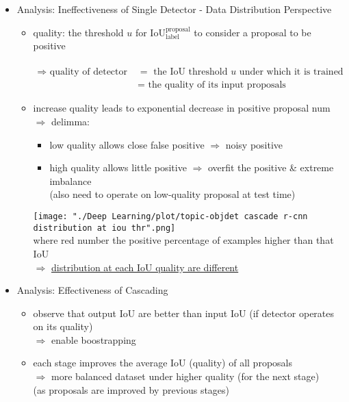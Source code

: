 \begin{itemize}
\begin{itemize}
	\item Analysis: Ineffectiveness of Single Detector - Data Distribution Perspective
		\begin{itemize}
		\item quality: the threshold $u$ for IoU$^\text{proposal}_\text{label}$ to consider a proposal to be positive \\
		\abovedisplayskip=2pt\abovedisplayshortskip=2pt~\vspace*{-\baselineskip}
		\begin{align*} \Rightarrow \text{ quality of detector } &= \text{ the IoU threshold } u \text{ under which it is trained} \\
		&= \text{ the quality of its input proposals} \end{align*}
		\item increase quality leads to exponential decrease in positive proposal num \\
		$\Rightarrow$ delimma: 
			\begin{itemize}
			\item low quality allows close false positive $\Rightarrow$ noisy positive
			\item high quality allows little positive $\Rightarrow$ overfit the positive \& extreme imbalance \\
			(also need to operate on low-quality proposal at test time)
			\end{itemize}
		\texttt{[image: "./Deep Learning/plot/topic-objdet cascade r-cnn distribution at iou thr".png]} \\
		where red number the positive percentage of examples higher than that IoU \\
		$\Rightarrow$ \underline{distribution at each IoU quality are different}
		\end{itemize}
	\item Analysis: Effectiveness of Cascading
		\begin{itemize}
		\item observe that output IoU are better than input IoU (if detector operates on its quality) \\
		$\Rightarrow$ enable boostrapping
		\item each stage improves the average IoU (quality) of all proposals \\
		$\Rightarrow$ more balanced dataset under higher quality (for the next stage) \\
		(as proposals are improved by previous stages)
		\end{itemize}

\end{itemize}
\end{itemize}
